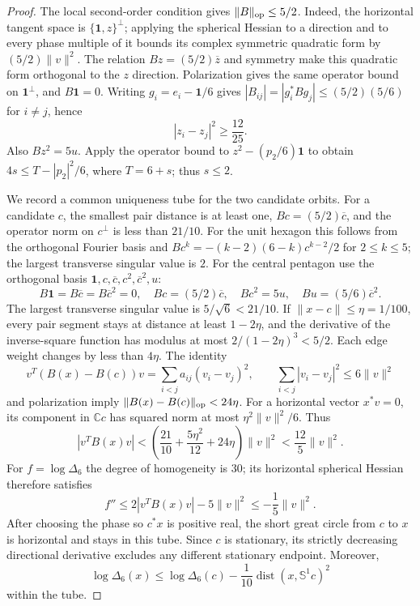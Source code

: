 \documentclass[11pt]{article}
\theoremstyle{remark}
\numberwithin{equation}{section}
\begin{document}
\begin{proof}
The local second-order condition gives $\|B\|_{\rm op}\le5/2$.
Indeed, the horizontal tangent space is
$\{\mathbf1,z\}^{\perp}$; applying the spherical Hessian to a
direction and to every phase multiple of it bounds its complex
symmetric quadratic form by $(5/2)\|v\|^2$.
The relation $Bz=(5/2)\overline z$ and symmetry make this
quadratic form orthogonal to the $z$ direction. Polarization gives
the same operator bound on $\mathbf1^\perp$, and $B\mathbf1=0$.
Writing $g_i=e_i-\mathbf1/6$ gives
$|B_{ij}|=|g_i^*Bg_j|\le(5/2)(5/6)$ for $i\ne j$, hence
\begin{equation}\label{eq:noclass-six-basic}
 |z_i-z_j|^2\ge\frac{12}{25}.
\end{equation}
Also $Bz^2=5u$. Apply the operator bound to
$z^2-(p_2/6)\mathbf1$ to obtain
$4s\le T-|p_2|^2/6$, where $T=6+s$; thus $s\le2$.

We record a common uniqueness tube for the two candidate orbits.
For a candidate $c$, the smallest pair distance is at least one,
$Bc=(5/2)\overline c$, and the operator norm on $c^\perp$
is less than $21/10$. For the unit hexagon this follows from the
orthogonal Fourier basis and
$Bc^k=-(k-2)(6-k)c^{k-2}/2$ for $2\le k\le5$;
the largest transverse singular value is $2$.
For the central pentagon use the orthogonal basis
$\mathbf1,c,\overline c,c^2,\overline c^2,u$:
\[
 B\mathbf1=B\overline c=B\overline c^2=0,\quad
 Bc=(5/2)\overline c,\quad Bc^2=5u,\quad
 Bu=(5/6)\overline c^2 .
\]
The largest transverse singular value is $5/\sqrt6<21/10$.
If $\|x-c\|\le\eta=1/100$, every pair segment stays at distance
at least $1-2\eta$, and the derivative of the inverse-square
function has modulus at most $2/(1-2\eta)^3<5/2$.
Each edge weight changes by less than $4\eta$. The identity
\[
 v^T(B(x)-B(c))v
  =\sum_{i<j}a_{ij}(v_i-v_j)^2,\qquad
 \sum_{i<j}|v_i-v_j|^2\le6\|v\|^2
\]
and polarization imply $\|B(x)-B(c)\|_{\rm op}<24\eta$.
For a horizontal vector $x^*v=0$, its component in $\mathbb Cc$
has squared norm at most $\eta^2\|v\|^2/6$. Thus
\[
 |v^TB(x)v|
 <\left(\frac{21}{10}+\frac{5\eta^2}{12}+24\eta\right)\|v\|^2
 <\frac{12}{5}\|v\|^2 .
\]
For $f=\log\Delta_6$ the degree of homogeneity is $30$; its
horizontal spherical Hessian therefore satisfies
\[
       f''\le 2|v^TB(x)v|-5\|v\|^2\le-\frac15\|v\|^2.
\]
After choosing the phase so $c^*x$ is positive real, the short
great circle from $c$ to $x$ is horizontal and stays in this tube.
Since $c$ is stationary, its strictly decreasing directional
derivative excludes any different stationary endpoint. Moreover,
\begin{equation}\label{eq:noclass-six-tube}
 \log\Delta_6(x)\le\log\Delta_6(c)
             -\frac1{10}\operatorname{dist}(x,\mathbb S^1c)^2
\end{equation}
within the tube.


\end{proof}
\end{document}
